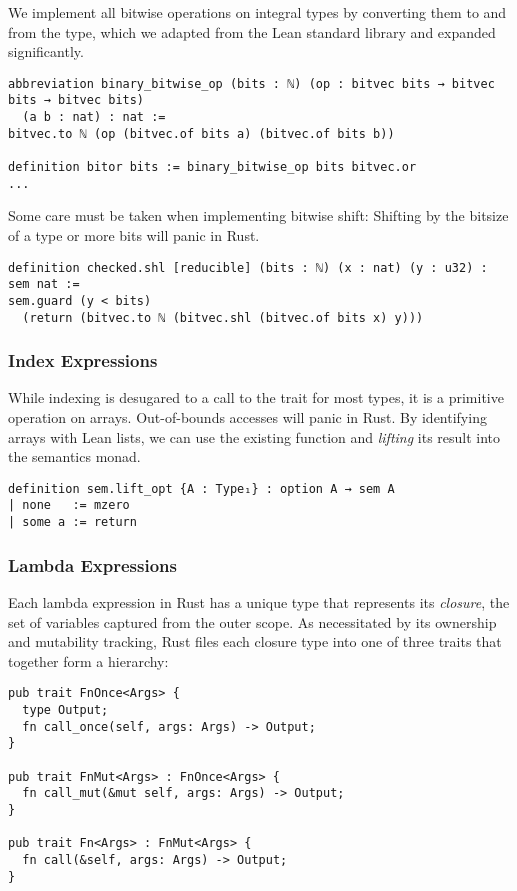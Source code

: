 We implement all bitwise operations on integral types by converting them to and
from the  type, which we adapted from the Lean standard
library and expanded significantly.

\begin{verbatim}
abbreviation binary_bitwise_op (bits : ℕ) (op : bitvec bits → bitvec bits → bitvec bits)
  (a b : nat) : nat :=
bitvec.to ℕ (op (bitvec.of bits a) (bitvec.of bits b))

definition bitor bits := binary_bitwise_op bits bitvec.or
...
\end{verbatim}

Some care must be taken when implementing bitwise shift: Shifting by the bitsize
of a type or more bits will panic in Rust.

\begin{verbatim}
definition checked.shl [reducible] (bits : ℕ) (x : nat) (y : u32) : sem nat :=
sem.guard (y < bits)
  (return (bitvec.to ℕ (bitvec.shl (bitvec.of bits x) y)))
\end{verbatim}

\subsubsection{Index Expressions}

While indexing is desugared to a call to the  trait for most types,
it is a primitive operation on arrays. Out-of-bounds accesses will panic in
Rust. By identifying arrays with Lean lists, we can use the existing
 function and \emph{lifting} its result into the semantics monad.

\begin{verbatim}
definition sem.lift_opt {A : Type₁} : option A → sem A
| none   := mzero
| some a := return 
\end{verbatim}

\subsubsection{Lambda Expressions}
\label{sec:lambda}

Each lambda expression in Rust has a unique type that represents its
\emph{closure}, the set of variables captured from the outer scope.
As necessitated by its ownership and mutability tracking, Rust files each
closure type into one of three traits that together form a hierarchy:

\begin{verbatim}
pub trait FnOnce<Args> {
  type Output;
  fn call_once(self, args: Args) -> Output;
}

pub trait FnMut<Args> : FnOnce<Args> {
  fn call_mut(&mut self, args: Args) -> Output;
}

pub trait Fn<Args> : FnMut<Args> {
  fn call(&self, args: Args) -> Output;
}
\end{verbatim}

